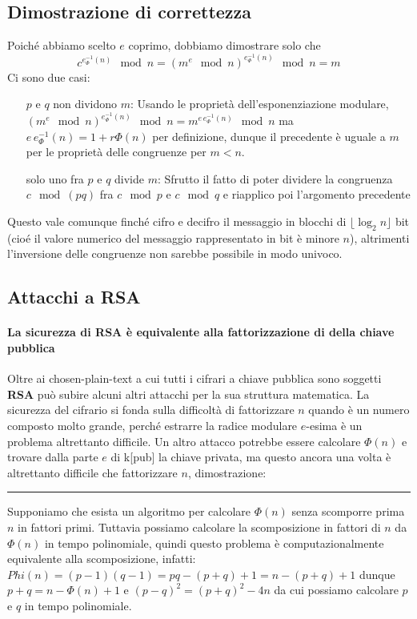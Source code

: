 \documentclass{article}
\begin{document}
\subsection{Dimostrazione di correttezza}
Poiché abbiamo scelto $e$ coprimo, dobbiamo dimostrare solo che \[
c^{e^{-1}_\Phi(n)} \mod n = (m^e\mod n)^{e^{-1}_\Phi(n)}\mod n= m
\]
Ci sono due casi:
\begin{enumerate}
    \item[$p$ e $q$ non dividono $m$:] Usando le proprietà dell'esponenziazione modulare, $(m^e\mod n)^{e^{-1}_\Phi(n)}\mod n= m^{e\,e^{-1}_\Phi(n)}\mod n$ ma $e\,e^{-1}_\Phi(n)=1+r\Phi(n)$ per definizione, dunque il precedente è uguale a $m$ per le proprietà delle congruenze per $m<n$.
    
    \item[solo uno fra $p$ e $q$ divide $m$:] Sfrutto il fatto di poter dividere la congruenza $c\mod (pq)$ fra $c\mod p$ e $c\mod q$ e riapplico poi l'argomento precedente
\end{enumerate}
Questo vale  comunque finché cifro e decifro il messaggio in blocchi di $\lfloor \log_2 n\rfloor$ bit (cioé il valore numerico del messaggio rappresentato in bit è minore $n$), altrimenti l'inversione delle congruenze non sarebbe possibile in modo univoco.

\subsection{Attacchi a RSA}
\paragraph{La sicurezza di RSA è equivalente alla fattorizzazione di della chiave pubblica}

Oltre ai chosen-plain-text a cui tutti i cifrari a chiave pubblica sono soggetti \textbf{RSA} può subire alcuni altri attacchi per la sua struttura matematica. La sicurezza del cifrario si fonda sulla difficoltà di fattorizzare $n$ quando è un numero composto molto grande, perché estrarre la radice modulare $e$-esima è un problema altrettanto difficile. Un altro attacco potrebbe essere calcolare $\Phi(n)$ e trovare dalla parte $e$ di k[pub] la chiave privata, ma questo ancora una volta è altrettanto difficile che fattorizzare $n$, dimostrazione:
\hrule
Supponiamo che esista un algoritmo per calcolare $\Phi(n)$ senza scomporre prima $n$ in fattori primi. Tuttavia possiamo calcolare la scomposizione in fattori di $n$ da $\Phi(n)$ in tempo polinomiale, quindi questo problema è computazionalmente equivalente alla scomposizione, infatti: $Phi(n)=(p-1)(q-1)=pq-(p+q)+1=n-(p+q)+1$ dunque $p+q=n-\Phi(n)+1$ e $(p-q)^2=(p+q)^2-4n$ da cui possiamo calcolare $p$ e $q$ in tempo polinomiale.
\end{document}
